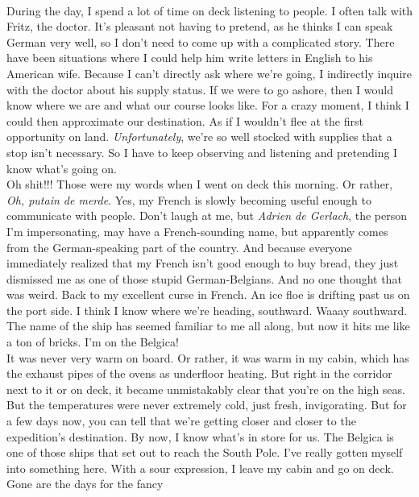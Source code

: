 \documentclass{article}
\begin{document}
  \\
  \noindent During the day, I spend a lot of time on deck listening to people. I often talk with Fritz, the doctor. It's
  pleasant not having to pretend, as he thinks I can speak German very well, so I don't need to come up with a
  complicated story. There have been situations where I could help him write letters in English to his American
  wife. Because I can't directly ask where we're going, I indirectly inquire with the doctor about his supply
  status. If we were to go ashore, then I would know where we are and what our course looks like. For a crazy
  moment, I think I could then approximate our destination. As if I wouldn't flee at the first opportunity on
  land.
  \textit{Unfortunately}, we're so well stocked with supplies that a stop isn't necessary. So I have to keep
  observing
  and listening and pretending I know what's going on.
  \\
  \noindent Oh shit!!! Those were my words when I went on deck this morning. Or rather, \textit{Oh, putain de merde}. Yes, my
  French is slowly becoming useful enough to communicate with people. Don't laugh at me, but \textit{Adrien de
    Gerlach}, the person I'm impersonating, may have a French-sounding name, but apparently comes from the
  German-speaking part of the country. And because everyone immediately realized that my French isn't good enough
  to
  buy bread, they just dismissed me as one of those stupid German-Belgians. And no one thought that was weird.
  Back
  to my excellent curse in French. An ice floe is drifting past us on the port side. I think I know where we're
  heading, southward. Waaay southward. The name of the ship has seemed familiar to me all along, but now it hits
  me
  like a ton of bricks. I'm on the Belgica!\\
  \noindent It was never very warm on board. Or rather, it was warm in my cabin, which has the exhaust pipes of the ovens
  as
  underfloor heating. But right in the corridor next to it or on deck, it became unmistakably clear that you're on
  the high seas. But the temperatures were never extremely cold, just fresh, invigorating. But for a few days now,
  you can tell that we're getting closer and closer to the expedition's destination. By now, I know what's in
  store
  for us. The Belgica is one of those ships that set out to reach the South Pole. I've really gotten myself into
  something here. With a sour expression, I leave my cabin and go on deck. Gone are the days for the fancy
\end{document}
